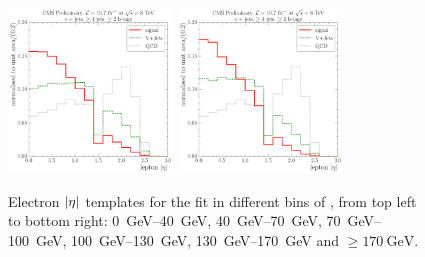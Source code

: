 \begin{figure}[!htbp]
    \hspace*{\fill} \\
    \hspace*{\fill}
    {\includegraphics[width=0.39\textwidth]{measurement/WPT/central/fit_templates/electron_templates_bin_130-170}}\hfill
    {\includegraphics[width=0.39\textwidth]{measurement/WPT/central/fit_templates/electron_templates_bin_170-inf}}
    \hspace*{\fill}
    \caption[Electron $\abs \eta$ templates for the fit in different bins of \WPT]{Electron $\abs \eta$ templates for
    the fit in different bins of \WPT, from top left to bottom right: \SIrange{0}{40}{\GeV}, \SIrange{40}{70}{\GeV},
    \SIrange{70}{100}{\GeV}, \SIrange{100}{130}{\GeV}, \SIrange{130}{170}{\GeV} and $\geq \SI{170}{\GeV}$.}
    \label{fig:fit_tempaltes_WPT_electron}
\end{figure}

